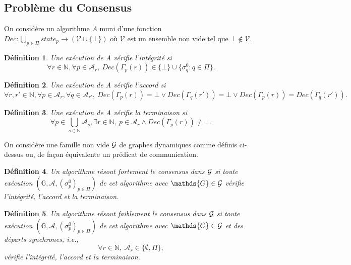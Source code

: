 \documentclass{article}
\newtheorem{definition}{Définition}
\begin{document}
\subsection{Probl\`eme du Consensus}

On considère un algorithme $A$ muni d'une fonction
	$Dec : \bigcup\limits_{p \in \Pi} state_p  \rightarrow (\mathcal{V} \cup \{\bot\})$ 
	où $\mathcal{V}$ est un ensemble non vide tel que $\bot \notin \mathcal{V} $.

\begin{definition}
	Une exécution de A \emph{vérifie  l'intégrité} si 
	$$ \forall r \in \mathds{N},\forall p \in \mathcal{A}_{r}, \ Dec(\Gamma_p(r)) \in \{ \bot \} \cup  \{ \sigma^0_q :  q \in \Pi \}  .$$
\end{definition}

\begin{definition}
	Une exécution de A  \emph{vérifie l'accord} si
	$$\forall r, r'  \in \mathds{N}, \forall p \in \mathcal{A}_{r}, \forall q \in \mathcal{A}_{r'}, 
		\ Dec(\Gamma_p(r)) = \bot \vee Dec(\Gamma_q(r')) = \bot \vee Dec(\Gamma_p(r)) = Dec(\Gamma_q(r')) .$$
\end{definition}

\begin{definition}
	Une exécution de A \emph{vérifie la terminaison} si
	$$ \forall p \in \bigcup\limits_{s \in \mathds{N}} \mathcal{A}_s, \exists r \in \mathds{N}, \ 
		p \in \mathcal{A}_r \wedge Dec(\Gamma_p(r)) \neq \bot .  $$
\end{definition}

On consid\`ere une famille non vide ${\cal G}$ de graphes dynamiques comme d\'efinis ci-dessus
	ou, de fa\c{c}on \'equivalente un pr\'edicat de communication. %
	
\begin{definition}
	Un algorithme \emph{résout fortement le consensus dans ${\cal G}$} si toute exécution 
	$( \mathds{G} ,  \mathcal{A} , (\sigma^0_p)_{p \in \Pi})$    de cet algorithme
	avec $ \mathds{G} \in {\cal G}$  vérifie l'intégrité, l'accord et la terminaison.
\end{definition}

\begin{definition}
	Un algorithme \emph{résout faiblement le consensus dans ${\cal G}$} si toute exécution 
	$( \mathds{G} ,  \mathcal{A} , (\sigma^0_p)_{p \in \Pi})$     de cet algorithme  avec
	$ \mathds{G} \in {\cal G}$  et des d\'eparts synchrones, i.e., 
	$$ \forall r \in \mathds{N}, \  \mathcal{A}_r \in \{\emptyset, \Pi\}  ,$$ 
	vérifie l'intégrité, l'accord et la terminaison.
\end{definition}
\end{document}
